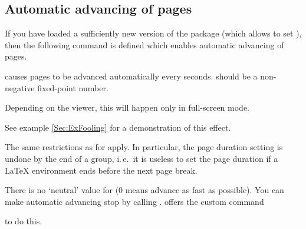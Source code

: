 \documentclass[12pt]{scrartcl}
\let\newslide=\relax
\begin{document}
  \newslide

  \subsection{Automatic advancing of pages}\label{Sec:PageDuration}
  If you have loaded a sufficiently new version of the
  \href{ftp://ftp.dante.de/tex-archive/help/Catalogue/entries/hyperref.html}{} package (which allows to
  set ), then the following command is defined which enables automatic advancing of 
  pages.

  causes pages to be advanced automatically every 
  seconds.  should be a non-negative fixed-point number.

  \pause

  Depending on the  viewer, this will happen only in full-screen mode.

  See example \ref{Sec:ExFooling} for a demonstration of this effect.

  \stopAdvancing

  \newslide

  The same restrictions as for  apply. In particular, the page duration setting is undone by
  the end of a group, i.\,e.\ it is useless to set the page duration if a \LaTeX{} environment ends before the next page
  break.

  There is no `neutral' value for  ($0$ means advance as fast as possible). You can make automatic advancing
  stop by calling .  offers the custom command
  \begin{center}
  \end{center}
  to do this.

  \newslide

\end{document}
